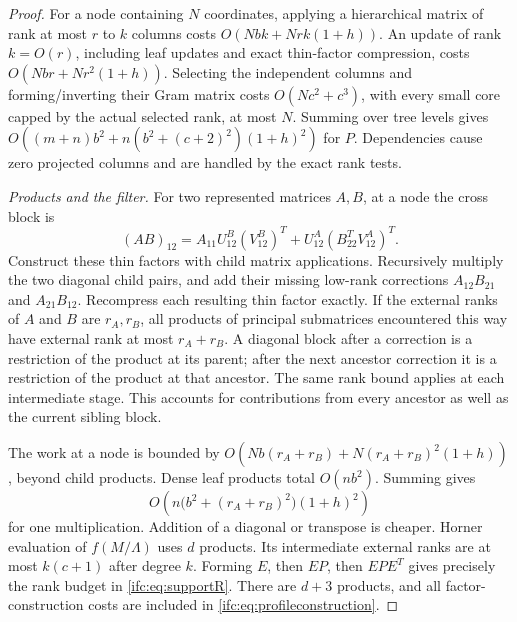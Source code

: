 \documentclass[11pt]{amsart}
\theoremstyle{definition}\newtheorem{definition}[theorem]{Definition}
\theoremstyle{remark}\newtheorem{remark}[theorem]{Remark}
\numberwithin{equation}{section}
\begin{document}
\begin{proof}
For a node containing $N$ coordinates, applying a hierarchical matrix of
rank at most $r$ to $k$ columns costs
$O(Nbk+Nrk(1+h))$. An update of rank $k=O(r)$, including leaf updates and
exact thin-factor compression, costs
$O(Nbr+Nr^2(1+h))$. Selecting the independent columns and forming/inverting
their Gram matrix costs $O(Nc^2+c^3)$, with every small core capped by the actual selected rank, at most $N$. Summing over tree levels gives
$O((m+n)b^2+n(b^2+(c+2)^2)(1+h)^2)$ for $P$.
Dependencies cause zero projected columns and are handled by the exact
rank tests.

\emph{Products and the filter.}
For two represented matrices $A,B$, at a node the cross block is
\[
 (AB)_{12}=A_{11}U^B_{12}(V^B_{12})^T
        +U^A_{12}(B_{22}^TV^A_{12})^T.
\]
Construct these thin factors with child matrix applications. Recursively
multiply the two diagonal child pairs, and add their missing low-rank
corrections $A_{12}B_{21}$ and $A_{21}B_{12}$. Recompress each resulting
thin factor exactly. If the external ranks of $A$ and $B$ are $r_A,r_B$,
all products of principal submatrices encountered this way have external
rank at most $r_A+r_B$. A diagonal block after a correction is a restriction
of the product at its parent; after the next ancestor correction it is a
restriction of the product at that ancestor. The same rank bound applies
at each intermediate stage. This accounts for contributions from every ancestor as well as the
current sibling block.

The work at a node is bounded by
$O(Nb(r_A+r_B)+N(r_A+r_B)^2(1+h))$, beyond child products.
Dense leaf products total $O(nb^2)$. Summing gives
\[
 O\!\left(n\bigl(b^2+(r_A+r_B)^2\bigr)(1+h)^2\right)
\]
for one multiplication. Addition of a diagonal or transpose is cheaper.
Horner evaluation of $f(M/\Lambda)$ uses $d$ products. Its intermediate
external ranks are at most $k(c+1)$ after degree $k$. Forming $E$, then
$EP$, then $EPE^T$ gives precisely the rank budget in
\eqref{ifc:eq:supportR}. There are $d+3$ products, and all factor-construction
costs are included in \eqref{ifc:eq:profileconstruction}.
\end{proof}
\end{document}
